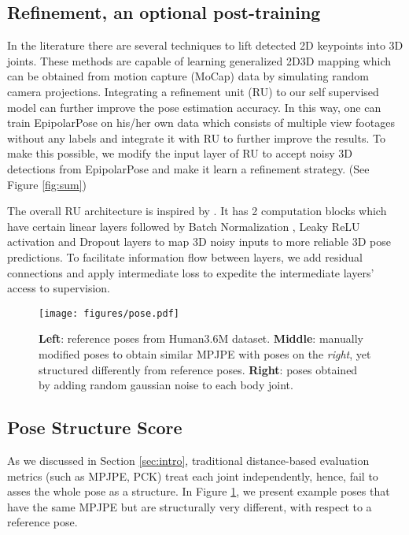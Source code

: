 \documentclass[10pt,twocolumn,letterpaper]{article}
\begin{document}
\subsection{Refinement, an optional post-training} 

In the literature there are several techniques \cite{martinez_2017_3dbaseline,posegrammar2018, fuse_tekin} to lift detected 2D keypoints into 3D joints. These methods are capable of learning generalized 2D3D mapping which can be obtained from motion capture (MoCap) data by simulating random camera projections. Integrating a refinement unit (RU) to our self supervised model can further improve the pose estimation accuracy. In this way, one can train EpipolarPose on his/her own data which consists of multiple view footages without any labels and integrate it with RU to further improve the results. To make this possible, we modify the input layer of RU to accept noisy 3D detections from EpipolarPose and make it learn a refinement strategy. (See Figure \ref{fig:sum})

The overall RU architecture is inspired by \cite{martinez_2017_3dbaseline,posegrammar2018}. It has 2 computation blocks which have certain linear layers followed by Batch Normalization \cite{batchnormalization}, Leaky ReLU \cite{leakyrelu} activation and Dropout layers to map 3D noisy inputs to more reliable 3D pose predictions. To facilitate information flow between layers, we add residual connections \cite{He2016} and apply intermediate loss to expedite the intermediate layers’ access to supervision.

\begin{figure}
\centering
\texttt{[image: figures/pose.pdf]}
\caption{\textbf{Left}: reference poses from Human3.6M dataset. \textbf{Middle}: manually modified poses to obtain similar MPJPE with poses on the \textit{right}, yet structured differently from reference poses. \textbf{Right}: poses obtained by adding random gaussian noise to each body joint.}
\label{fig:pose}
\end{figure}
\subsection{Pose Structure Score}
\label{sec:pss}

As we discussed in Section \ref{sec:intro}, traditional distance-based evaluation metrics (such as MPJPE, PCK) treat each joint independently, hence, fail to asses the whole pose as a structure. In Figure \ref{fig:pose}, we present example poses that have the same MPJPE but are structurally very different, with respect to a reference pose.  
\end{document}
